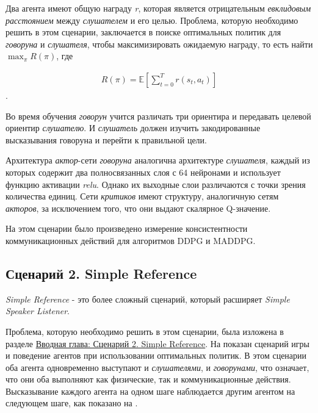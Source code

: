 Два агента имеют общую награду \textit{r}, которая является отрицательным \textit{евклидовым расстоянием} между \textit{слушателем} и его целью. Проблема, которую необходимо решить в этом сценарии, заключается в поиске оптимальных политик для \textit{говоруна} и \textit{слушателя}, чтобы максимизировать ожидаемую награду, то есть найти $\max_{\pi}R(\pi)$, где

\begin{equation}
    \begin{multlined}
        R(\pi) = \mathbb{E}[\sum_{t=0}^{T}r(s_t, a_t)]
    \end{multlined}
\end{equation}.

Во время обучения \textit{говорун} учится различать три ориентира и передавать целевой ориентир \textit{слушателю}. И \textit{слушатель} должен изучить закодированные высказывания говоруна и перейти к правильной цели.

Архитектура \textit{актор}-сети \textit{говоруна} аналогична архитектуре \textit{слушателя}, каждый из которых содержит два полносвязанных слоя с 64 нейронами и использует функцию активации \textit{relu}. Однако их выходные слои различаются с точки зрения количества единиц. Сети \textit{критиков} имеют структуру, аналогичную сетям \textit{акторов}, за исключением того, что они выдают скалярное Q-значение.

На этом сценарии было произведено измерение консистентности коммуникационных действий для алгоритмов DDPG и MADDPG.

\subsection{Сценарий 2. Simple Reference} \label{exp-sr}

\textit{Simple Reference} - это более сложный сценарий, который расширяет \textit{Simple Speaker Listener}.

Проблема, которую необходимо решить в этом сценарии, была изложена в разделе \hyperref[intro-sr]{Вводная глава: Сценарий 2. Simple Reference}. На  показан сценарий игры и поведение агентов при использовании оптимальных политик. В этом сценарии оба агента одновременно выступают и \textit{слушателями}, и \textit{говорунами}, что означает, что они оба выполняют как физические, так и коммуникационные действия. Высказывание каждого агента на одном шаге наблюдается другим агентом на следующем шаге, как показано на . %

